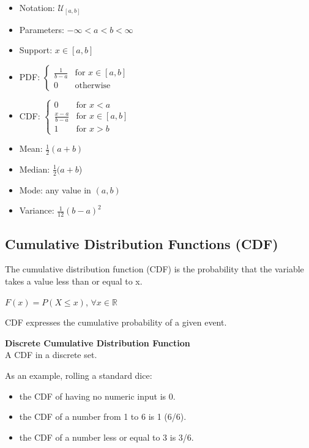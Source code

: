 \documentclass{article}
\begin{document}
\begin{itemize}
    \item Notation: $\displaystyle {\mathcal {U}}_{[a,b]}$
    \item Parameters: $\displaystyle -\infty <a<b<\infty$
    \item Support: $\displaystyle x\in [a,b]$
    \item PDF: $\displaystyle {\begin{cases}{\frac {1}{b-a}}&{\text{for }}x\in [a,b]\\0&{\text{otherwise}}\end{cases}}$
    \item CDF: $\displaystyle {\begin{cases}0&{\text{for }}x<a\\{\frac {x-a}{b-a}}&{\text{for }}x\in [a,b]\\1&{\text{for }}x>b\end{cases}}$
    \item Mean: $\displaystyle {\tfrac {1}{2}}(a+b)$
    \item Median:	$\displaystyle {\tfrac {1}{2}}(a+b$)
    \item Mode:	any value in $\displaystyle (a,b)$
    \item Variance:	$\displaystyle {\tfrac {1}{12}}(b-a)^{2}$
\end{itemize}

\subsection{Cumulative Distribution Functions (CDF)}
The cumulative distribution function (CDF) is the probability that the variable takes a value less than or equal to x. 

$F(x) = P(X \leq x)$, $\forall x \in \mathbb{R}$  

CDF expresses the cumulative probability of a given event.

\textbf{Discrete Cumulative Distribution Function} \\
A CDF in a discrete set.

As an example, rolling a standard dice:
\begin{itemize}
    \item the CDF of having no numeric input is 0.
    \item the CDF of a number from 1 to 6 is 1 (6/6).
    \item the CDF of a number less or equal to 3 is 3/6.
\end{itemize}
\end{document}
